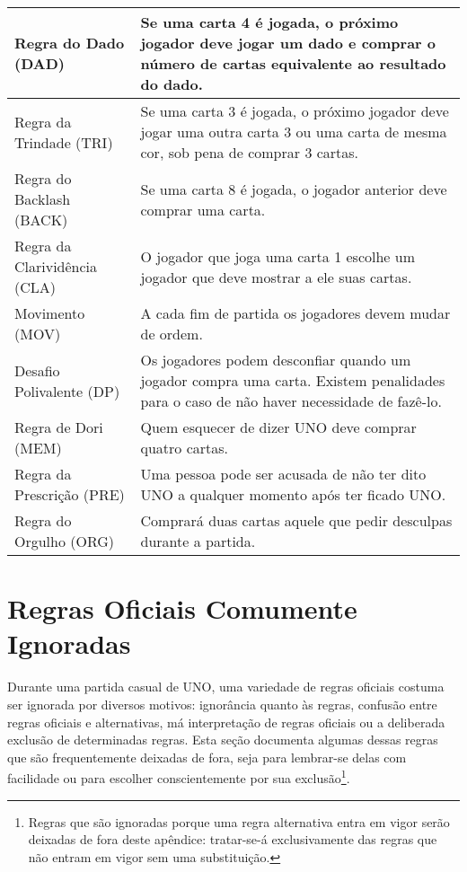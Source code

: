 \begin{center}
\begin{longtable}{|p{4cm}|p{5cm}|}
Regra do Dado (DAD) & Se uma carta 4 é jogada, o próximo jogador deve jogar um dado e comprar o número de cartas equivalente ao resultado do dado. \\ \hline
Regra da Trindade (TRI) & Se uma carta 3 é jogada, o próximo jogador deve jogar uma outra carta 3 ou uma carta de mesma cor, sob pena de comprar 3 cartas. \\ \hline 
Regra do Backlash (BACK) & Se uma carta 8 é jogada, o jogador anterior deve comprar uma carta. \\ \hline 
Regra da Clarividência (CLA) & O jogador que joga uma carta 1 escolhe um jogador que deve mostrar a ele suas cartas. \\ \hline 
Movimento (MOV) & A cada fim de partida os jogadores devem mudar de ordem. \\ \hline
Desafio Polivalente (DP) & Os jogadores podem desconfiar quando um jogador compra uma carta. Existem penalidades para o caso de não haver necessidade de fazê-lo. \\ \hline
Regra de Dori (MEM) & Quem esquecer de dizer UNO deve comprar quatro cartas. \\ \hline
Regra da Prescrição (PRE) & Uma pessoa pode ser acusada de não ter dito UNO a qualquer momento após ter ficado UNO. \\ \hline
Regra do Orgulho (ORG) & Comprará duas cartas aquele que pedir desculpas durante a partida. \\ \hline
\end{longtable}
\end{center}

\newpage

\section{Regras Oficiais Comumente Ignoradas}

Durante uma partida casual de UNO, uma variedade de regras oficiais costuma ser ignorada por diversos motivos: ignorância quanto às regras, confusão entre regras oficiais e alternativas, má interpretação de regras oficiais ou a deliberada exclusão de determinadas regras. Esta seção documenta algumas dessas regras que são frequentemente deixadas de fora, seja para lembrar-se delas com facilidade ou para escolher conscientemente por sua exclusão\footnote{Regras que são ignoradas porque uma regra alternativa entra em vigor serão deixadas de fora deste apêndice: tratar-se-á exclusivamente das regras que não entram em vigor sem uma substituição.}.


